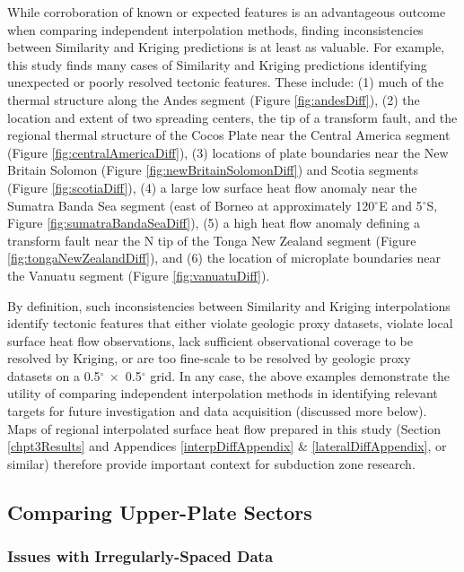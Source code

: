 While corroboration of known or expected features is an advantageous outcome when comparing independent interpolation methods, finding inconsistencies between Similarity and Kriging predictions is at least as valuable. For example, this study finds many cases of Similarity and Kriging predictions identifying unexpected or poorly resolved tectonic features. These include: (1) much of the thermal structure along the Andes segment (Figure \ref{fig:andesDiff}), (2) the location and extent of two spreading centers, the tip of a transform fault, and the regional thermal structure of the Cocos Plate near the Central America segment (Figure \ref{fig:centralAmericaDiff}), (3) locations of plate boundaries near the New Britain Solomon (Figure \ref{fig:newBritainSolomonDiff}) and Scotia segments (Figure \ref{fig:scotiaDiff}), (4) a large low surface heat flow anomaly near the Sumatra Banda Sea segment (east of Borneo at approximately 120\(^\circ\)E and 5\(^\circ\)S, Figure \ref{fig:sumatraBandaSeaDiff}), (5) a high heat flow anomaly defining a transform fault near the N tip of the Tonga New Zealand segment (Figure \ref{fig:tongaNewZealandDiff}), and (6) the location of microplate boundaries near the Vanuatu segment (Figure \ref{fig:vanuatuDiff}).

By definition, such inconsistencies between Similarity and Kriging interpolations identify tectonic features that either violate geologic proxy datasets, violate local surface heat flow observations, lack sufficient observational coverage to be resolved by Kriging, or are too fine-scale to be resolved by geologic proxy datasets on a 0.5\(^\circ\ \times\) 0.5\(^\circ\) grid. In any case, the above examples demonstrate the utility of comparing independent interpolation methods in identifying relevant targets for future investigation and data acquisition (discussed more below). Maps of regional interpolated surface heat flow prepared in this study (Section \ref{chpt3Results} and Appendices \ref{interpDiffAppendix} \& \ref{lateralDiffAppendix}, or similar) therefore provide important context for subduction zone research.

\hypertarget{comparing-upper-plate-sectors}{%
\subsection{Comparing Upper-Plate Sectors}\label{comparing-upper-plate-sectors}}

\hypertarget{issues-with-irregularly-spaced-data}{%
\subsubsection{Issues with Irregularly-Spaced Data}\label{issues-with-irregularly-spaced-data}}

